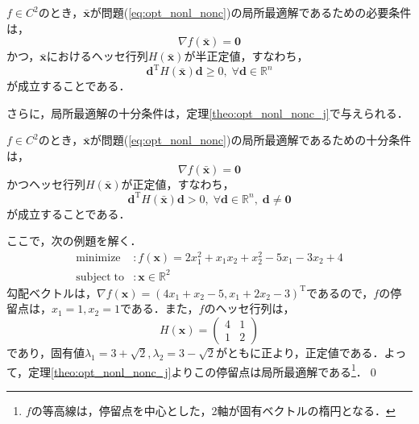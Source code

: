 \documentclass{jsreport}
\begin{document}
\begin{theo}\label{theo:opt_nonl_nonc_h_2}
  $f \in C^2$のとき，$\bar{\bm{x}}$が問題(\ref{eq:opt_nonl_nonc})の局所最適解であるための必要条件は，
  \begin{equation}
    \nabla f(\bar{\bm{x}}) = \bm{0} \nonumber
  \end{equation}
  かつ，$\bar{\bm{x}}$におけるヘッセ行列$H(\bar{\bm{x}})$が半正定値，すなわち，
  \begin{equation}
    \bm{d}^{\mathrm{T}} H(\bar{\bm{x}}) \bm{d} \geq 0, \; \forall \bm{d} \in \mathbb{R}^n \nonumber
  \end{equation}
  が成立することである．
\end{theo}

さらに，局所最適解の十分条件は，定理\ref{theo:opt_nonl_nonc_j}で与えられる．
\begin{theo}\label{theo:opt_nonl_nonc_j}
  $f \in C^2$のとき，$\bar{\bm{x}}$が問題(\ref{eq:opt_nonl_nonc})の局所最適解であるための十分条件は，
  \begin{equation}
    \nabla f(\bar{\bm{x}}) = \bm{0} \nonumber
  \end{equation}
  かつヘッセ行列$H(\bar{\bm{x}})$が正定値，すなわち，
  \begin{equation}
    \bm{d}^{\mathrm{T}} H(\bar{\bm{x}}) \bm{d} > 0, \; \forall \bm{d} \in \mathbb{R}^n, \; \bm{d} \neq \bm{0} \nonumber
  \end{equation}
  が成立することである．
\end{theo}

ここで，次の例題を解く．
\begin{align}\label{eq:opt_nonl_nonc}
  \mathrm{minimize} &: f(\bm{x}) = 2x_1^2 + x_1 x_2 + x_2^2 - 5x_1 - 3x_2 + 4 \nonumber\\
  \mathrm{subject \; to} &: \bm{x} \in \mathbb{R}^2 \nonumber
\end{align}
勾配ベクトルは，$\nabla f(\bm{x}) = (4x_1 + x_2 - 5, x_1 + 2x_2 - 3)^{\mathrm{T}}$であるので，$f$の停留点は，$x_1 = 1, x_2 = 1$である．また，$f$のヘッセ行列は，
\begin{equation}
  H(\bm{x}) = \left(
  \begin{array}{cc}
    4 & 1 \\
    1 & 2
  \end{array}
  \right) \nonumber
\end{equation}
であり，固有値$\lambda_1 = 3 + \sqrt{2}, \lambda_2 = 3 - \sqrt{2}$がともに正より，正定値である．よって，定理\ref{theo:opt_nonl_nonc_j}よりこの停留点は局所最適解である\footnote{$f$の等高線は，停留点を中心とした，2軸が固有ベクトルの楕円となる．}．\qed
\end{document}
